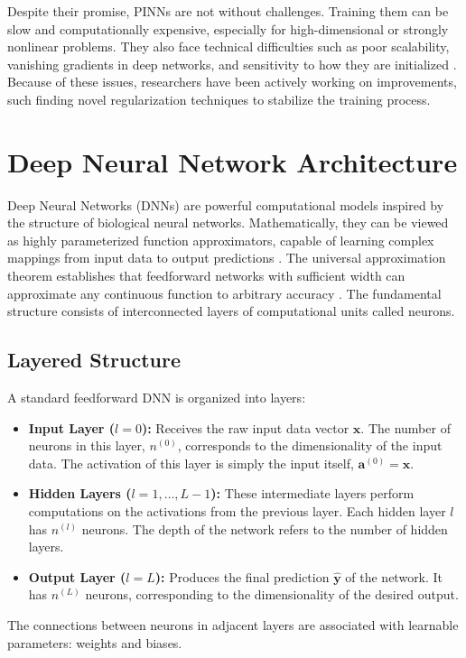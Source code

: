 \documentclass[11pt,twoside,openright]{report}
\begin{document}
Despite their promise, PINNs are not without challenges. Training them can be slow and computationally expensive, especially for high-dimensional or strongly nonlinear problems. They also face technical difficulties such as poor scalability, vanishing gradients in deep networks, and sensitivity to how they are initialized \cite{beck2021solving}. Because of these issues, researchers have been actively working on improvements, such finding novel regularization techniques to stabilize the training process.

\section{Deep Neural Network Architecture}

Deep Neural Networks (DNNs) are powerful computational models inspired by the structure of biological neural networks. Mathematically, they can be viewed as highly parameterized function approximators, capable of learning complex mappings from input data to output predictions \cite{goodfellow2016deep}. The universal approximation theorem establishes that feedforward networks with sufficient width can approximate any continuous function to arbitrary accuracy \cite{hornik1989multilayer}. The fundamental structure consists of interconnected layers of computational units called neurons.

\subsection{Layered Structure}
A standard feedforward DNN is organized into layers:
\begin{itemize}
    \item \textbf{Input Layer ($l=0$):} Receives the raw input data vector $\mathbf{x}$. The number of neurons in this layer, $n^{(0)}$, corresponds to the dimensionality of the input data. The activation of this layer is simply the input itself, $\mathbf{a}^{(0)} = \mathbf{x}$.
    \item \textbf{Hidden Layers ($l=1, \dots, L-1$):} These intermediate layers perform computations on the activations from the previous layer. Each hidden layer $l$ has $n^{(l)}$ neurons. The depth of the network refers to the number of hidden layers.
    \item \textbf{Output Layer ($l=L$):} Produces the final prediction $\hat{\mathbf{y}}$ of the network. It has $n^{(L)}$ neurons, corresponding to the dimensionality of the desired output.
\end{itemize}
The connections between neurons in adjacent layers are associated with learnable parameters: weights and biases.
\end{document}
